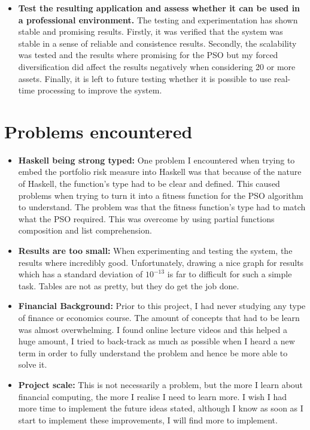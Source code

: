 \begin{itemize}
    \item \textbf{Test the resulting application and assess whether it can be used in a professional environment.} The testing and experimentation has shown stable and promising results. Firstly, it was verified that the system was stable in a sense of reliable and consistence results. Secondly, the scalability was tested and the results where promising for the PSO but my forced diversification did affect the results negatively when considering 20 or more assets. Finally, it is left to future testing whether it is possible to use real-time processing to improve the system.
  \end{itemize}

  \section{Problems encountered} %
  \label{sec:problems_encountered}
    \begin{itemize}
      \item \textbf{Haskell being strong typed:} One problem I encountered when trying to embed the portfolio risk measure into Haskell was that because of the nature of Haskell, the function's type had to be clear and defined. This caused problems when trying to turn it into a fitness function for the PSO algorithm to understand. The problem was that the fitness function's type had to match what the PSO required. This was overcome by using partial functions composition and list comprehension. 
      \item \textbf{Results are too small:} When experimenting and testing the system, the results where incredibly good. Unfortunately, drawing a nice graph for results which has a standard deviation of $10^{-13}$ is far to difficult for such a simple task. Tables are not as pretty, but they do get the job done. 
      \item \textbf{Financial Background:} Prior to this project, I had never studying any type of finance or economics course. The amount of concepts that had to be learn was almost overwhelming. I found online lecture videos and this helped a huge amount, I tried to back-track as much as possible when I heard a new term in order to fully understand the problem and hence be more able to solve it.
      \item \textbf{Project scale:} This is not necessarily a problem, but the more I learn about financial computing, the more I realise I need to learn more. I wish I had more time to implement the future ideas stated, although I know as soon as I start to implement these improvements, I will find more to implement.
    \end{itemize}

